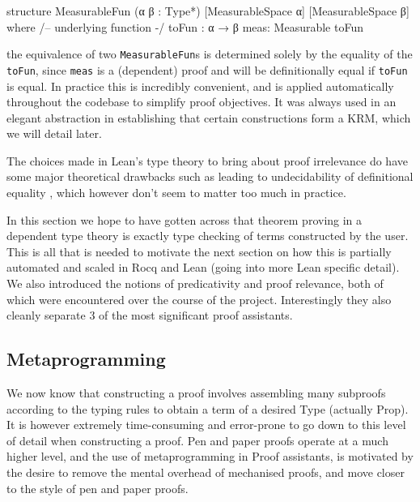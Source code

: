 \begin{leancode}
structure MeasurableFun (α β : Type*) [MeasurableSpace α] [MeasurableSpace β] where
  /-- underlying function -/
  toFun : α → β
  meas: Measurable toFun
\end{leancode}

the equivalence of two \texttt{MeasurableFun}s is determined solely by the equality of the \texttt{toFun}, since \texttt{meas} is a (dependent) proof and will be 
definitionally equal if \texttt{toFun} is equal. In practice this is incredibly convenient, and is applied automatically throughout the codebase to simplify proof
objectives. It was always used in an elegant abstraction in establishing that certain constructions form a KRM, which we will detail later.

The choices made in Lean's type theory to bring about proof irrelevance do have some major theoretical drawbacks such as leading to undecidability of definitional
equality \citep[see chapter 3]{mario}, which however don't seem to matter too much in practice.



In this section we hope to have gotten across that theorem proving in a dependent type theory is exactly type checking of terms constructed by the user. This is all that is needed
to motivate the next section \label{sec:meta} on how this is partially automated and scaled in Rocq and Lean (going into more Lean specific detail). We also introduced the notions of
predicativity and proof relevance, both of which were encountered over the course of the project. Interestingly they also cleanly separate 3
of the most significant proof assistants.

\subsection{Metaprogramming}
\label{sec:meta}
We now know that constructing a proof involves assembling many subproofs according to the typing rules to obtain a term of a desired Type (actually Prop).
It is however extremely time-consuming and error-prone to go down to this level of detail when constructing a proof. Pen and paper proofs operate at a much
higher level, and the use of metaprogramming in Proof assistants, is motivated by the desire to remove the mental overhead of mechanised proofs, and move closer
to the style of pen and paper proofs.


